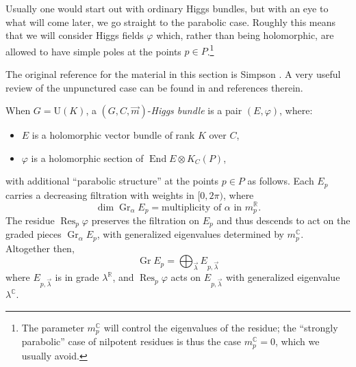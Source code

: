 \documentclass[12pt,letterpaper,reqno]{article}
\numberwithin{equation}{section}
\newcommand{\R}{\ensuremath{\mathbb R}}
\newcommand{\C}{\ensuremath{\mathbb C}}
\newcommand{\de}{\mathrm{d}}
\newcommand{\ti}[1]{\textit{#1}}
\DeclareMathOperator{\End}{End}
\DeclareMathOperator{\Res}{Res}
\DeclareMathOperator{\Gr}{Gr}
\newcommand{\SU}{\mathrm{SU}}
\newcommand{\U}{\mathrm{U}}
\begin{document}
Usually one would start out with ordinary Higgs bundles,
but with an eye to what will come later, we go straight
to the parabolic case. Roughly this means that we will consider
Higgs fields $\varphi$ which, rather than being holomorphic, are
allowed to have simple poles at the points $p \in P$.\footnote{The parameter $m_p^\C$ will
control the eigenvalues of the residue; the
``strongly parabolic'' case of nilpotent residues
is thus the case $m_p^\C = 0$, which we usually
avoid.}

The original reference for the material in this section
is Simpson \cite{hbnc}.
A very useful review of the unpunctured case can be found in
\cite{Wentworth2014} and references therein.

\begin{defn}[Parabolic Higgs bundles for $G = \U(K)$]
When $G = \U(K)$, a $(G, C, \vec m)$-\ti{Higgs bundle} is a pair $(E, \varphi)$, where:
\begin{itemize}
  \item $E$ is a holomorphic vector bundle of rank $K$ over $C$,
  \item $\varphi$ is a holomorphic section of $\End E \otimes K_C(P)$,
\end{itemize}
with additional ``parabolic structure'' at the points $p \in P$
as follows. Each $E_p$ carries a decreasing filtration with weights in $[0,2\pi)$, where 
\begin{equation}
  \dim \Gr_\alpha E_p = \text{multiplicity of $\alpha$ in $m_p^\R$}.
\end{equation}
The residue $\Res_p \varphi$
preserves the filtration on $E_p$ and thus descends to
act on the graded pieces $\Gr_\alpha E_p$, with generalized
eigenvalues determined by $m_p^\C$. Altogether then,
\begin{equation}
 \Gr E_p = \bigoplus_{\vec{\lambda}} E_{p,\vec\lambda}
\end{equation}
where $E_{p,\vec\lambda}$ is in grade $\lambda^\R$, and 
$\Res_p \varphi$ acts on $E_{p,\vec\lambda}$
with generalized eigenvalue $\lambda^\C$.
\end{defn}

\end{document}
